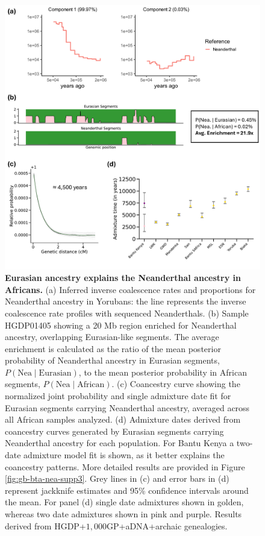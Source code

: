 \begin{figure}[h!]
    \centering
    \includegraphics[width=\linewidth]{figures/gb_bta/gb_real_bta_6.pdf}
    \captionsetup{width=\textwidth+3cm}
    \caption{
    \footnotesize
    \textbf{Eurasian ancestry explains the Neanderthal ancestry in Africans.} (a) Inferred inverse coalescence rates and proportions for Neanderthal ancestry in Yorubans: the line represents the inverse coalescence rate profiles with sequenced Neanderthals. (b) Sample HGDP01405 showing a 20 Mb region enriched for Neanderthal ancestry, overlapping Eurasian-like segments. The average enrichment is calculated as the ratio of the mean posterior probability of Neanderthal ancestry in Eurasian segments, $P(\text{Nea} \mid \text{Eurasian})$, to the mean posterior probability in African segments, $P(\text{Nea} \mid \text{African})$. (c) Coancestry curve showing the normalized joint probability and single admixture date fit for Eurasian segments carrying Neanderthal ancestry, averaged across all African samples analyzed. (d) Admixture dates derived from coancestry curves generated by Eurasian segments carrying Neanderthal ancestry for each population. For Bantu Kenya a two-date admixture model fit is shown, as it better explains the coancestry patterns. More detailed results are provided in Figure \ref{fig:gb-bta-nea-supp3}. Grey lines in (c) and error bars in (d) represent jackknife estimates and 95\% confidence intervals around the mean. For panel (d) single date admixtures shown in golden, whereas two date admixtures shown in pink and purple. Results derived from HGDP+$1{,}000$GP+aDNA+archaic genealogies.}
    \label{fig:gb_bta_nea}
\end{figure}


